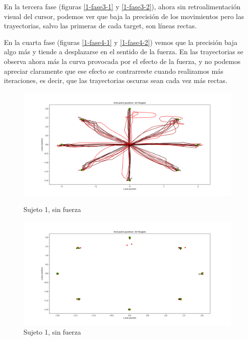 \documentclass[a4paper,11pt, oneside]{book}
\begin{document}
En la tercera fase (figuras \ref{1-fase3-1} y \ref{1-fase3-2}), ahora sin retroalimentación visual del cursor, podemos ver que baja la precisión de los movimientos pero las trayectorias, salvo las primeras de cada target, son líneas rectas.

En la cuarta fase (figuras \ref{1-fase4-1} y \ref{1-fase4-2}) vemos que la precisión baja algo más y tiende a desplazarse en el sentido de la fuerza. En las trayectorias se observa ahora más la curva provocada por el  efecto de la fuerza, y no podemos apreciar claramente que ese efecto se contrarreste cuando realizamos más iteraciones, es decir, que las trayectorias oscuras sean cada vez más rectas.

\begin{figure}[H]
	\begin{minipage}[b]{0.5\linewidth}
		\centering
		\includegraphics[width=\linewidth]{sujeto1/no_force/trayectorias}
		\caption{Sujeto 1, sin fuerza}
		\label{1-fase1-1}
	\end{minipage}
	\hspace{0.5cm}
	\begin{minipage}[b]{0.5\linewidth}
		\centering
		\includegraphics[width=\linewidth]{sujeto1/no_force/trayectorias_puntos}
		\caption{Sujeto 1, sin fuerza}
		\label{1-fase1-2}
	\end{minipage}
\end{figure}
\end{document}

